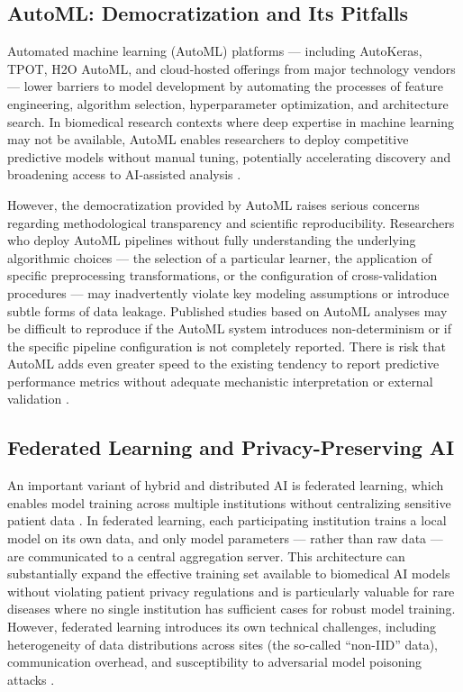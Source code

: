\subsection{AutoML: Democratization and Its Pitfalls}

Automated machine learning (AutoML) platforms --- including AutoKeras, TPOT, H2O AutoML, and cloud-hosted offerings from major technology vendors --- lower barriers to model development by automating the processes of feature engineering, algorithm selection, hyperparameter optimization, and architecture search. In biomedical research contexts where deep expertise in machine learning may not be available, AutoML enables researchers to deploy competitive predictive models without manual tuning, potentially accelerating discovery and broadening access to AI-assisted analysis \parencite{he2021}.

However, the democratization provided by AutoML raises serious concerns regarding methodological transparency and scientific reproducibility. Researchers who deploy AutoML pipelines without fully understanding the underlying algorithmic choices --- the selection of a particular learner, the application of specific preprocessing transformations, or the configuration of cross-validation procedures --- may inadvertently violate key modeling assumptions or introduce subtle forms of data leakage. Published studies based on AutoML analyses may be difficult to reproduce if the AutoML system introduces non-determinism or if the specific pipeline configuration is not completely reported. There is risk that AutoML adds even greater speed to the existing tendency to report predictive performance metrics without adequate mechanistic interpretation or external validation \parencite{kapoor2023}.

\subsection{Federated Learning and Privacy-Preserving AI}

An important variant of hybrid and distributed AI is federated learning, which enables model training across multiple institutions without centralizing sensitive patient data \parencite{rieke2020}. In federated learning, each participating institution trains a local model on its own data, and only model parameters --- rather than raw data --- are communicated to a central aggregation server. This architecture can substantially expand the effective training set available to biomedical AI models without violating patient privacy regulations and is particularly valuable for rare diseases where no single institution has sufficient cases for robust model training. However, federated learning introduces its own technical challenges, including heterogeneity of data distributions across sites (the so-called ``non-IID'' data), communication overhead, and susceptibility to adversarial model poisoning attacks \parencite{kairouz2021}.

